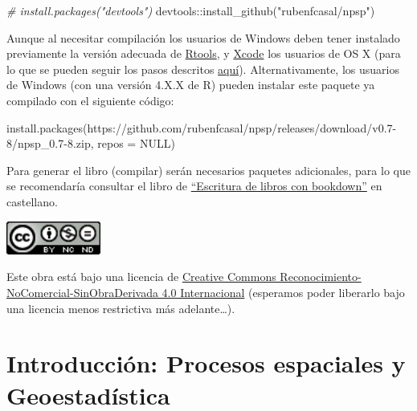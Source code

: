 \documentclass[
  spanish,
]{book}
\newenvironment{Shaded}{\begin{snugshade}}{\end{snugshade}}
\newcommand{\AttributeTok}[1]{\textcolor[rgb]{0.77,0.63,0.00}{#1}}
\newcommand{\CommentTok}[1]{\textcolor[rgb]{0.56,0.35,0.01}{\textit{#1}}}
\newcommand{\ConstantTok}[1]{\textcolor[rgb]{0.00,0.00,0.00}{#1}}
\newcommand{\FunctionTok}[1]{\textcolor[rgb]{0.00,0.00,0.00}{#1}}
\newcommand{\NormalTok}[1]{#1}
\newcommand{\SpecialCharTok}[1]{\textcolor[rgb]{0.00,0.00,0.00}{#1}}
\newcommand{\StringTok}[1]{\textcolor[rgb]{0.31,0.60,0.02}{#1}}
\theoremstyle{break}
\theoremstyle{definition}
\theoremstyle{definition}
\theoremstyle{definition}
\theoremstyle{definition}
\theoremstyle{remark}
\begin{document}
\begin{Shaded}
\begin{Highlighting}[]
\CommentTok{\# install.packages("devtools")}
\NormalTok{devtools}\SpecialCharTok{::}\FunctionTok{install\_github}\NormalTok{(}\StringTok{"rubenfcasal/npsp"}\NormalTok{)}
\end{Highlighting}
\end{Shaded}

Aunque al necesitar compilación los usuarios de Windows deben tener instalado previamente la versión adecuada de \href{https://cran.r-project.org/bin/windows/Rtools/}{Rtools}, y \href{https://apps.apple.com/us/app/xcode/id497799835}{Xcode} los usuarios de OS X
(para lo que se pueden seguir los pasos descritos \href{https://rubenfcasal.github.io/post/instalacion-de-r}{aquí}).
Alternativamente, los usuarios de Windows (con una versión 4.X.X de R) pueden instalar este paquete ya compilado con el siguiente código:

\begin{Shaded}
\begin{Highlighting}[]
\FunctionTok{install.packages}\NormalTok{(}\StringTok{\textquotesingle{}https://github.com/rubenfcasal/npsp/releases/download/v0.7{-}8/npsp\_0.7{-}8.zip\textquotesingle{}}\NormalTok{, }
                 \AttributeTok{repos =} \ConstantTok{NULL}\NormalTok{)}
\end{Highlighting}
\end{Shaded}

Para generar el libro (compilar) serán necesarios paquetes adicionales,
para lo que se recomendaría consultar el libro de \href{https://rubenfcasal.github.io/bookdown_intro}{``Escritura de libros con bookdown''} en castellano.

\includegraphics[width=1.22in]{images/by-nc-nd-88x31}

Este obra está bajo una licencia de \href{https://creativecommons.org/licenses/by-nc-nd/4.0/deed.es_ES}{Creative Commons Reconocimiento-NoComercial-SinObraDerivada 4.0 Internacional}
(esperamos poder liberarlo bajo una licencia menos restrictiva más adelante\ldots).

\hypertarget{intro-estesp}{%
\chapter{Introducción: Procesos espaciales y Geoestadística}\label{intro-estesp}}
\end{document}
